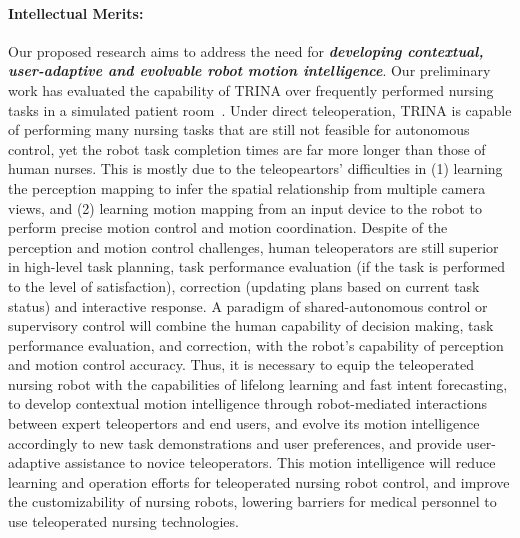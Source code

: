 \documentclass[letterpaper, 11 pt, onecolumn]{article}
\begin{document}
\paragraph*{Intellectual Merits:} Our proposed research aims to address the need for \textit{\textbf{developing contextual, user-adaptive and evolvable robot motion intelligence}}. Our preliminary work has evaluated the capability of TRINA over frequently performed nursing tasks in a simulated patient room~\cite{Hauser_Li_TRINA:17}. Under direct teleoperation, TRINA is capable of performing many nursing tasks that are still not feasible for autonomous control, yet the robot task completion times are far more longer than those of human nurses. This is mostly due to the teleopeartors' difficulties in (1) learning the perception mapping to infer the spatial relationship from multiple camera views, and (2) learning motion mapping from an input device to the robot to perform precise motion control and motion coordination. Despite of the perception and motion control challenges, human teleoperators are still superior in high-level task planning, task performance evaluation (if the task is performed to the level of satisfaction), correction (updating plans based on current task status) and interactive response. A paradigm of shared-autonomous control or supervisory control will combine the human capability of decision making, task performance evaluation, and correction, with the robot's capability of perception and motion control accuracy. Thus, it is necessary to equip the teleoperated nursing robot with the capabilities of lifelong learning and fast intent forecasting, to develop contextual motion intelligence through robot-mediated interactions between expert teleopertors and end users, and evolve its motion intelligence accordingly to new task demonstrations and user preferences, and provide user-adaptive assistance to novice teleoperators. This motion intelligence will reduce learning and operation efforts for teleoperated nursing robot control, and improve the customizability of nursing robots, lowering barriers for medical personnel to use teleoperated nursing technologies. 



\end{document}
